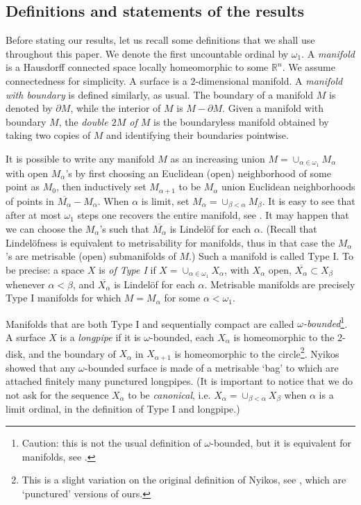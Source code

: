 \documentclass{amsart}
\begin{document}
\subsection{Definitions and statements of the results}\label{definitionsandstatements}

Before stating our results, let us recall some definitions that we shall use throughout this paper.
We denote the first uncountable ordinal by $\omega_1$.
A {\em manifold} is a Hausdorff connected space locally homeomorphic to some ${\mathbb R}^n$. We assume connectedness for simplicity. A surface is a $2$-dimensional manifold.
A {\em manifold with boundary} is defined similarly, as usual.
The boundary of a manifold $M$ is denoted by $\partial M$, while the interior of $M$ is $M-\partial M$.
Given a manifold with boundary $M$, the {\em double $2M$ of $M$} is the boundaryless manifold obtained by taking two copies of  $M$ and identifying their boundaries pointwise.

It is possible to write any manifold $M$ as an increasing union $M=\cup_{\alpha\in\omega_1}M_\alpha$
with open $M_\alpha$'s  by
first choosing an Euclidean (open) neighborhood of some point as $M_0$, then 
inductively set $M_{\alpha+1}$ to be $M_\alpha$ union Euclidean neighborhoods of points in ${\overline{{M_{\alpha}}}}-M_\alpha$.
When $\alpha$ is limit, set $M_\alpha=\cup_{\beta<\alpha}M_\beta$. It is easy to see that after at most $\omega_1$ steps one recovers the 
entire manifold, see \cite[Theorem 2.9]{Nyikos84}.
It may happen that we can choose the $M_\alpha$'s such that ${\overline{{M_\alpha}}}$ is Lindel\"of for each $\alpha$. 
(Recall that Lindel\"ofness is equivalent to metrisability for manifolds, thus in that case
the $M_\alpha$'s are metrisable (open) submanifolds of $M$.)
Such a manifold is called Type I. To be precise: a space $X$ is {\em of Type I} if $X=\cup_{\alpha\in\omega_1}X_\alpha$, with $X_\alpha$ open,
${\overline{{X_\alpha}}}\subset X_\beta$ whenever $\alpha < \beta$, and ${\overline{{X_\alpha}}}$ is Lindel\"of for each $\alpha$.
Metrisable manifolds are precisely Type I manifolds for which
$M=M_\alpha$ for some $\alpha<\omega_1$.

Manifolds that are both Type I and sequentially compact are called 
{\em $\omega$-bounded}\footnote{Caution: this is not the usual definition of $\omega$-bounded, but it is equivalent for manifolds, see \cite[Corollary 5.4]{Nyikos84}.}.  A surface $X$ is a {\em longpipe} if it is $\omega$-bounded, each $X_\alpha$ is  homeomorphic to the $2$-disk, and the boundary of $X_\alpha$ in $X_{\alpha+1}$ is homeomorphic to the  circle\footnote{This is a slight variation on the original definition of Nyikos, see \cite{Nyikos84}, which are `punctured' versions of ours.}.
Nyikos showed that any $\omega$-bounded surface is made of a metrisable `bag' to which are attached finitely many {\color{red} punctured} longpipes.
(It is important to notice that we do not ask for the sequence $X_\alpha$ to be {\em canonical}, 
i.e. $X_\alpha=\cup_{\beta < \alpha}X_\beta$ when
$\alpha$ is a limit ordinal, in the definition of Type I and longpipe.)
\end{document}
